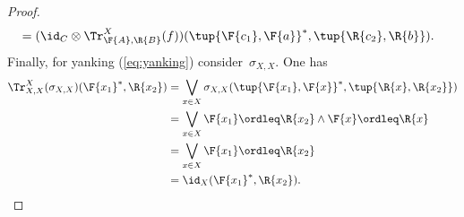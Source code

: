 \begin{proof}
\begin{equation}
\begin{aligned}
      &=(\id_C \otimes \Tr_{\F{A},\R{B}}^X(f))(\tup{\F{c_1},\F{a}}^*,\tup{\R{c_2},\R{b}}).
    \end{aligned}
  \end{equation}
  Finally, for yanking (\cref{eq:yanking}) consider~$\sigma_{X,X}$. One has
  \begin{equation}
    \begin{aligned}
      \Tr_{X,X}^{X}(\sigma_{X,X})(\F{x_1}^*,\R{x_2})&=\bigvee_{x\in X} \sigma_{X,X}(\tup{\F{x_1},\F{x}}^*,\tup{\R{x},\R{x_2}}) \\
      &=\bigvee_{x\in X} \F{x_1} \ordleq \R{x_2} \wedge \F{x}\ordleq \R{x}\\
      &=\bigvee_{x\in X} \F{x_1} \ordleq \R{x_2}\\
      &=\id_X(\F{x_1}^*,\R{x_2}).
    \end{aligned}
  \end{equation}
\end{proof}
